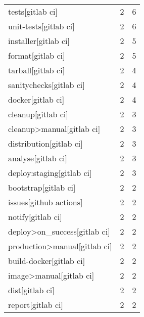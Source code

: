 \begin{tabular}{lrr}
tests[gitlab ci]                           &                   2 &             6 \\
unit-tests[gitlab ci]                      &                   2 &             6 \\
installer[gitlab ci]                       &                   2 &             5 \\
format[gitlab ci]                          &                   2 &             5 \\
tarball[gitlab ci]                         &                   2 &             4 \\
sanitychecks[gitlab ci]                    &                   2 &             4 \\
docker[gitlab ci]                          &                   2 &             4 \\
cleanup[gitlab ci]                         &                   2 &             3 \\
cleanup>manual[gitlab ci]                  &                   2 &             3 \\
distribution[gitlab ci]                    &                   2 &             3 \\
analyse[gitlab ci]                         &                   2 &             3 \\
deploy:staging[gitlab ci]                  &                   2 &             3 \\
bootstrap[gitlab ci]                       &                   2 &             2 \\
issues[github actions]                     &                   2 &             2 \\
notify[gitlab ci]                          &                   2 &             2 \\
deploy>on\_success[gitlab ci]               &                   2 &             2 \\
production>manual[gitlab ci]               &                   2 &             2 \\
build-docker[gitlab ci]                    &                   2 &             2 \\
image>manual[gitlab ci]                    &                   2 &             2 \\
dist[gitlab ci]                            &                   2 &             2 \\
report[gitlab ci]                          &                   2 &             2 \\

\end{tabular}
